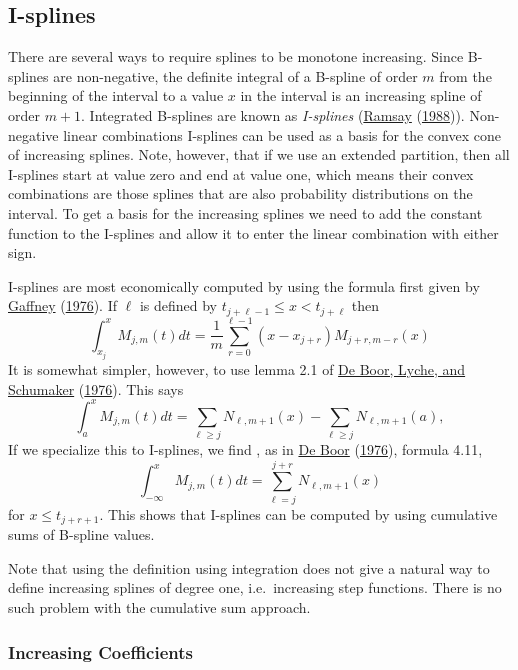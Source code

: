 \documentclass[
  12pt,
]{book}
\theoremstyle{definition}
\theoremstyle{definition}
\theoremstyle{definition}
\theoremstyle{definition}
\theoremstyle{remark}
\begin{document}
\hypertarget{mathisplines}{%
\subsection{I-splines}\label{mathisplines}}

There are several ways to require splines to be monotone increasing. Since B-splines are non-negative, the definite integral of a B-spline of order \(m\) from the beginning of the interval to a value \(x\) in the interval is an increasing spline of order \(m+1\). Integrated B-splines are known as \emph{I-splines} (\protect\hyperlink{ref-ramsay_88}{Ramsay} (\protect\hyperlink{ref-ramsay_88}{1988})). Non-negative linear combinations I-splines can be used as a basis for the convex cone of increasing splines. Note, however, that if we use an extended partition, then all I-splines start at value zero and end at value one, which means their convex combinations are those
splines that are also probability distributions on the interval. To get a basis for the increasing splines we need to
add the constant function to the I-splines and allow it to enter the linear combination with either sign.

I-splines are most economically computed by using the formula first given by \protect\hyperlink{ref-gaffney_76}{Gaffney} (\protect\hyperlink{ref-gaffney_76}{1976}). If \(\ell\) is defined by \(t_{j+\ell-1}\leq x<t_{j+\ell}\) then
\[
\int_{x_j}^x M_{j,m}(t)dt=\frac{1}{m}\sum_{r=0}^{ \ell-1}(x-x_{j+r})M_{j+r,m-r}(x)
\]
It is somewhat simpler, however, to use lemma 2.1 of \protect\hyperlink{ref-deboor_lyche_schumaker_76}{De Boor, Lyche, and Schumaker} (\protect\hyperlink{ref-deboor_lyche_schumaker_76}{1976}). This says
\[
\int_a^xM_{j,m}(t)dt=\sum_{\ell\geq j}N_{\ell,m+1}(x)-\sum_{\ell\geq j}N_{\ell,m+1}(a),
\]
If we specialize this to I-splines, we find , as in \protect\hyperlink{ref-deboor_76}{De Boor} (\protect\hyperlink{ref-deboor_76}{1976}), formula 4.11,
\[
\int_{-\infty}^x M_{j,m}(t)dt=\sum_{\ell=j}^{j+r}N_{\ell,m+1}(x)
\]
for \(x\leq t_{j+r+1}\). This shows that I-splines can be computed by using cumulative sums of B-spline values.

Note that using the definition using integration does not give a natural way to define increasing splines of degree one, i.e.~increasing step functions. There is no such problem with the cumulative sum approach.

\hypertarget{increasing-coefficients}{%
\subsubsection{Increasing Coefficients}\label{increasing-coefficients}}
\end{document}
